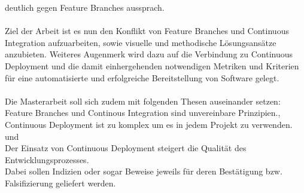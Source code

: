 \documentclass[11pt,english,german]{article}
\begin{document}
deutlich gegen \glqq Feature Branches\grqq{} aussprach.
\\
\\
Ziel der Arbeit ist es nun den Konflikt von \glqq Feature Branches\grqq{}  und \glqq Continuous Integration\grqq{}
aufzuarbeiten, sowie visuelle und methodische Lösungsansätze anzubieten.
Weiteres Augenmerk wird dazu auf die Verbindung zu \glqq Continuous Deployment\grqq{}  und die damit einhergehenden
notwendigen Metriken und Kriterien für eine automatisierte und erfolgreiche Bereitstellung von Software gelegt.
\\
\\
Die Masterarbeit soll sich zudem mit folgenden Thesen auseinander setzen: \\
\glqq Feature Branches und Continous Integration sind unvereinbare Prinzipien.\grqq{},\\
\glqq Continuous Deployment ist zu komplex um es in jedem Projekt zu verwenden.\grqq{} und\\
\glqq Der Einsatz von Continuous Deployment steigert die Qualität des Entwicklungsprozesses.\grqq{}\\
Dabei sollen Indizien oder sogar Beweise jeweils für deren Bestätigung bzw. Falsifizierung geliefert werden.
\end{document}
